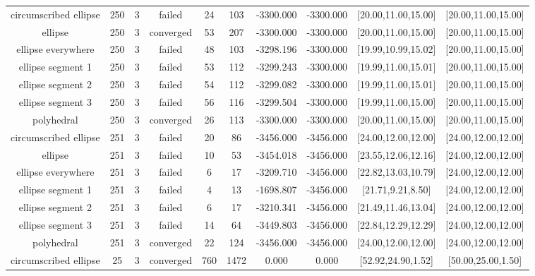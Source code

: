 \begin{tiny}
\begin{center}
\begin{tabular}{ c c c c c c c c c c }
  circumscribed ellipse   &  250  &  3  &   failed   &   24  &  103  & -3300.000  & -3300.000  & [20.00,11.00,15.00] & [20.00,11.00,15.00] \\
         ellipse          &  250  &  3  & converged  &   53  &  207  & -3300.000  & -3300.000  & [20.00,11.00,15.00] & [20.00,11.00,15.00] \\
    ellipse everywhere    &  250  &  3  &   failed   &   48  &  103  & -3298.196  & -3300.000  & [19.99,10.99,15.02] & [20.00,11.00,15.00] \\
    ellipse segment 1     &  250  &  3  &   failed   &   53  &  112  & -3299.243  & -3300.000  & [19.99,11.00,15.01] & [20.00,11.00,15.00] \\
    ellipse segment 2     &  250  &  3  &   failed   &   54  &  112  & -3299.082  & -3300.000  & [19.99,11.00,15.01] & [20.00,11.00,15.00] \\
    ellipse segment 3     &  250  &  3  &   failed   &   56  &  116  & -3299.504  & -3300.000  & [19.99,11.00,15.00] & [20.00,11.00,15.00] \\
        polyhedral        &  250  &  3  & converged  &   26  &  113  & -3300.000  & -3300.000  & [20.00,11.00,15.00] & [20.00,11.00,15.00] \\
  circumscribed ellipse   &  251  &  3  &   failed   &   20  &   86  & -3456.000  & -3456.000  & [24.00,12.00,12.00] & [24.00,12.00,12.00] \\
         ellipse          &  251  &  3  &   failed   &   10  &   53  & -3454.018  & -3456.000  & [23.55,12.06,12.16] & [24.00,12.00,12.00] \\
    ellipse everywhere    &  251  &  3  &   failed   &   6   &   17  & -3209.710  & -3456.000  & [22.82,13.03,10.79] & [24.00,12.00,12.00] \\
    ellipse segment 1     &  251  &  3  &   failed   &   4   &   13  & -1698.807  & -3456.000  & [21.71,9.21,8.50] & [24.00,12.00,12.00] \\
    ellipse segment 2     &  251  &  3  &   failed   &   6   &   17  & -3210.341  & -3456.000  & [21.49,11.46,13.04] & [24.00,12.00,12.00] \\
    ellipse segment 3     &  251  &  3  &   failed   &   14  &   64  & -3449.803  & -3456.000  & [22.84,12.29,12.29] & [24.00,12.00,12.00] \\
        polyhedral        &  251  &  3  & converged  &   22  &  124  & -3456.000  & -3456.000  & [24.00,12.00,12.00] & [24.00,12.00,12.00] \\
  circumscribed ellipse   &   25  &  3  & converged  &  760  &  1472 &   0.000    &   0.000    & [52.92,24.90,1.52] & [50.00,25.00,1.50] \\

\end{tabular}
\end{center}
\end{tiny}
